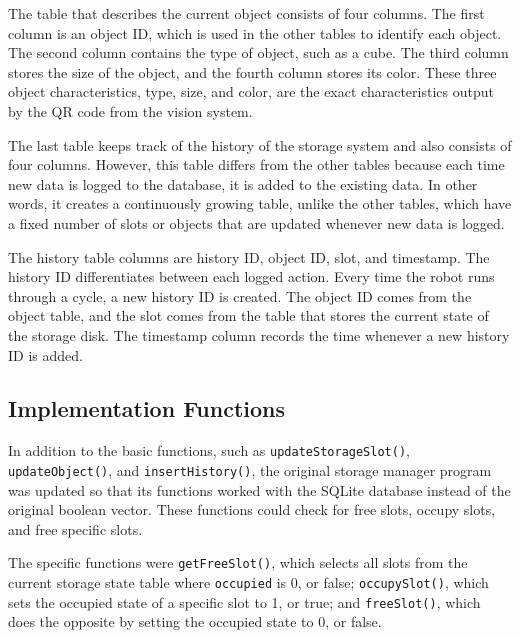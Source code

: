 The table that describes the current object consists of four columns. The first column is an object ID, which is used in the other tables to identify each object. The second column contains the type of object, such as a cube. The third column stores the size of the object, and the fourth column stores its color. These three object characteristics, type, size, and color, are the exact characteristics output by the QR code from the vision system.

The last table keeps track of the history of the storage system and also consists of four columns. However, this table differs from the other tables because each time new data is logged to the database, it is added to the existing data. In other words, it creates a continuously growing table, unlike the other tables, which have a fixed number of slots or objects that are updated whenever new data is logged.

The history table columns are history ID, object ID, slot, and timestamp. The history ID differentiates between each logged action. Every time the robot runs through a cycle, a new history ID is created. The object ID comes from the object table, and the slot comes from the table that stores the current state of the storage disk. The timestamp column records the time whenever a new history ID is added.

\subsection{Implementation Functions}
In addition to the basic functions, such as \texttt{updateStorageSlot()}, \texttt{updateObject()}, and \texttt{insertHistory()}, the original storage manager program was updated so that its functions worked with the SQLite database instead of the original boolean vector. These functions could check for free slots, occupy slots, and free specific slots.

The specific functions were \texttt{getFreeSlot()}, which selects all slots from the current storage state table where \texttt{occupied} is 0, or false; \texttt{occupySlot()}, which sets the occupied state of a specific slot to 1, or true; and \texttt{freeSlot()}, which does the opposite by setting the occupied state to 0, or false.
